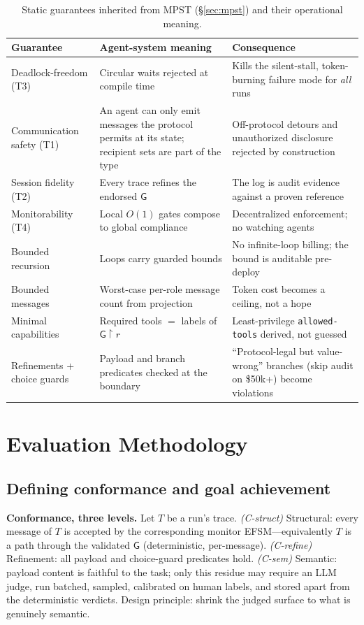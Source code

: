 \documentclass{article}
\newcommand{\gtG}{\mathsf{G}}
\newcommand{\proj}[2]{#1\!\upharpoonright\!#2}
\begin{document}
\begin{table}[t]
\centering\small
\caption{Static guarantees inherited from MPST (\S\ref{sec:mpst}) and their operational meaning.}
\label{tab:guarantees}
\begin{tabular}{@{}p{3.4cm}p{5.6cm}p{5.2cm}@{}}
\toprule
\textbf{Guarantee} & \textbf{Agent-system meaning} & \textbf{Consequence} \\
\midrule
Deadlock-freedom (T3) & Circular waits rejected at compile time & Kills the silent-stall, token-burning failure mode for \emph{all} runs \\
Communication safety (T1) & An agent can only emit messages the protocol permits at its state; recipient sets are part of the type & Off-protocol detours and unauthorized disclosure rejected by construction \\
Session fidelity (T2) & Every trace refines the endorsed $\gtG$ & The log is audit evidence against a proven reference \\
Monitorability (T4) & Local $O(1)$ gates compose to global compliance & Decentralized enforcement; no watching agents \\
Bounded recursion & Loops carry guarded bounds & No infinite-loop billing; the bound is auditable pre-deploy \\
Bounded messages & Worst-case per-role message count from projection & Token cost becomes a ceiling, not a hope \\
Minimal capabilities & Required tools $=$ labels of $\proj{\gtG}{r}$ & Least-privilege \texttt{allowed-tools} derived, not guessed \\
Refinements + choice guards & Payload and branch predicates checked at the boundary & ``Protocol-legal but value-wrong'' branches (skip audit on \$50k+) become violations \\
\bottomrule
\end{tabular}
\end{table}

\section{Evaluation Methodology}\label{sec:method}
\subsection{Defining conformance and goal achievement}
\textbf{Conformance, three levels.} Let $T$ be a run's trace. \emph{(C-struct)} Structural: every message of $T$ is accepted by the corresponding monitor EFSM---equivalently $T$ is a path through the validated $\gtG$ (deterministic, per-message). \emph{(C-refine)} Refinement: all payload and choice-guard predicates hold. \emph{(C-sem)} Semantic: payload content is faithful to the task; only this residue may require an LLM judge, run batched, sampled, calibrated on human labels, and stored apart from the deterministic verdicts. Design principle: shrink the judged surface to what is genuinely semantic.
\end{document}
